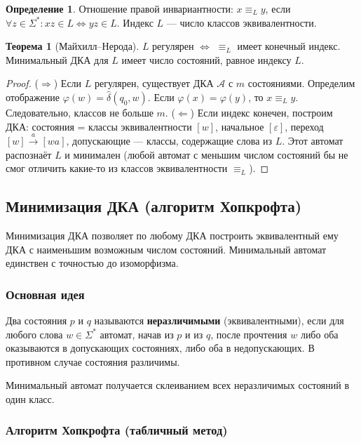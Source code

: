 \documentclass[12pt,a4paper]{article}
\theoremstyle{definition}
\newtheorem{definition}{Определение}[section]
\newtheorem{theorem}{Теорема}[section]
\newcommand{\emptystring}{\varepsilon}
\newcommand{\A}{\mathcal{A}}
\begin{document}
\begin{definition}
Отношение правой инвариантности: $x\equiv_L y$, если $\forall z\in\Sigma^*: xz\in L \iff yz\in L$. Индекс $L$ --- число классов эквивалентности.
\end{definition}

\begin{theorem}[Майхилл–Нерода]
$L$ регулярен $\iff$ $\equiv_L$ имеет конечный индекс. Минимальный ДКА для $L$ имеет число состояний, равное индексу $L$.
\end{theorem}

\begin{proof}
($\Rightarrow$) Если $L$ регулярен, существует ДКА $\A$ с $m$ состояниями. Определим отображение $\varphi(w)=\hat\delta(q_0,w)$. Если $\varphi(x)=\varphi(y)$, то $x\equiv_L y$. Следовательно, классов не больше $m$. ($\Leftarrow$) Если индекс конечен, построим ДКА: состояния = классы эквивалентности $[w]$, начальное $[\emptystring]$, переход $[w]\xrightarrow{a}[wa]$, допускающие --- классы, содержащие слова из $L$. Этот автомат распознаёт $L$ и минимален (любой автомат с меньшим числом состояний бы не смог отличить какие-то из классов эквивалентности $\equiv_L$).
\end{proof}

\subsection{Минимизация ДКА (алгоритм Хопкрофта)}
Минимизация ДКА позволяет по любому ДКА построить эквивалентный ему ДКА с наименьшим возможным числом состояний. Минимальный автомат единствен с точностью до изоморфизма.

\subsubsection{Основная идея}

Два состояния $p$ и $q$ называются \textbf{неразличимыми} (эквивалентными), если для любого слова $w\in\Sigma^*$ автомат, начав из $p$ и из $q$, после прочтения $w$ либо оба оказываются в допускающих состояниях, либо оба в недопускающих. В противном случае состояния различимы.

Минимальный автомат получается склеиванием всех неразличимых состояний в один класс.

\subsubsection{Алгоритм Хопкрофта (табличный метод)}
\end{document}
